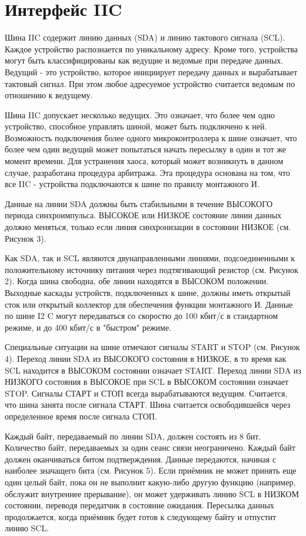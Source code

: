 \documentclass[a4paper,oneside ,10pt]{extreport}
\begin{document}
\section{Интерфейс IIC}

Шина IIC содержит линию данных (SDA) и линию тактового сигнала (SCL). 
Каждое устройство распознается по уникальному адресу.
Кроме того, устройства могут быть классифицированы как ведущие и ведомые при передаче данных.
Ведущий - это устройство, которое инициирует передачу данных и
вырабатывает тактовый сигнал. При этом любое адресуемое устройство считается
ведомым по отношению к ведущему. 

Шина IIC допускает несколько ведущих. Это означает, что более чем одно устройство, 
способное управлять шиной, может быть подключено к ней.
Возможность подключения более одного микроконтроллера к шине означает, что более
чем один ведущий может попытаться начать пересылку в один и тот же момент времени. 
Для устранения хаоса, который может возникнуть в данном случае, разработана
процедура арбитража. Эта процедура основана на том, что все IIC - устройства подключаются к шине по правилу монтажного И.

Данные на линии SDA должны быть стабильными в течение ВЫСОКОГО периода
синхроимпульса. ВЫСОКОЕ или НИЗКОЕ состояние линии данных должно меняться, 
только если линия синхронизации в состоянии НИЗКОЕ (см. Рисунок 3). 

Как SDA, так и SCL являются двунаправленными линиями, подсоединенными к
положительному источнику питания через подтягивающий резистор (см. Рисунок 2). 
Когда шина свободна, обе линии находятся в ВЫСОКОМ положении. Выходные каскады
устройств, подключенных к шине, должны иметь открытый сток или открытый коллектор
для обеспечения функции монтажного И. Данные по шине I2
C могут передаваться со скоростю до 100 кбит/с в стандартном режиме, и до 400 кбит/с в "быстром" режиме. 

Специальные ситуации на шине отмечают сигналы START и STOP (см. Рисунок 4). 
Переход линии SDA из ВЫСОКОГО состояния в НИЗКОЕ, в то время как SCL находится
в ВЫСОКОМ состоянии означает START. 
Переход линии SDA из НИЗКОГО состояния в ВЫСОКОЕ при SCL в ВЫСОКОМ
состоянии означает STOP. 
Сигналы СТАРТ и СТОП всегда вырабатываются ведущим. Считается, что шина занята
после сигнала СТАРТ. Шина считается освободившейся через определенное время после
сигнала СТОП. 

Каждый байт, передаваемый по линии SDA, должен состоять из 8 бит. Количество байт, передаваемых за один сеанс связи неограничено. Каждый байт должен оканчиваться битом подтверждения. Данные передаются, начиная с наиболее значащего бита (см. Рисунок 5). Если приёмник не может принять еще один целый байт, пока он не выполнит какую-либо другую функцию (например, обслужит внутреннее прерывание), он может удерживать линию SCL в НИЗКОМ состоянии, переводя передатчик в состояние ожидания. Пересылка данных продолжается, когда приёмник будет готов к следующему байту и отпустит линию SCL.
\end{document}
